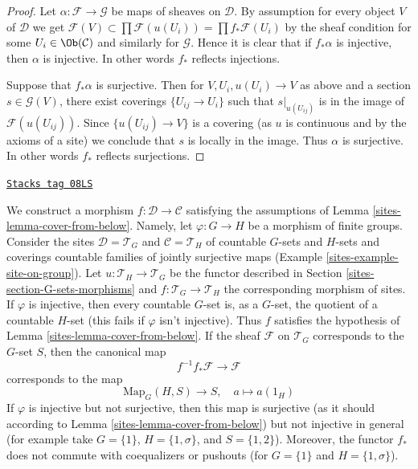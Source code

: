 \begin{proof}
Let $\alpha : \mathcal{F} \to \mathcal{G}$ be maps of sheaves
on $\mathcal{D}$. By assumption for every object $V$ of $\mathcal{D}$
we get $\mathcal{F}(V) \subset \prod \mathcal{F}(u(U_i)) =
\prod f_*\mathcal{F}(U_i)$ by the sheaf condition
for some $U_i \in \Ob(\mathcal{C})$ and similarly for $\mathcal{G}$.
Hence it is clear that if $f_*\alpha$ is injective, then
$\alpha$ is injective. In other words $f_*$ reflects injections.

\medskip\noindent
Suppose that $f_*\alpha$ is surjective. Then for $V, U_i, u(U_i) \to V$
as above and a section $s \in \mathcal{G}(V)$, there exist coverings
$\{U_{ij} \to U_i\}$ such that $s|_{u(U_{ij})}$ is in the image
of $\mathcal{F}(u(U_{ij}))$. Since $\{u(U_{ij}) \to V\}$ is a covering
(as $u$ is continuous and by the axioms of a site) we conclude that
$s$ is locally in the image. Thus $\alpha$ is surjective. In other
words $f_*$ reflects surjections.
\end{proof}

\begin{example}
\label{sites-example-cover-from-below}
\href{https://stacks.math.columbia.edu/tag/08LS}{\texttt{Stacks tag 08LS}}

We construct a morphism $f : \mathcal{D} \to \mathcal{C}$ satisfying
the assumptions of Lemma \ref{sites-lemma-cover-from-below}. Namely, let
$\varphi : G \to H$ be a morphism of finite groups. Consider the sites
$\mathcal{D} = \mathcal{T}_G$ and $\mathcal{C} = \mathcal{T}_H$ of countable
$G$-sets and $H$-sets and coverings countable families of jointly
surjective maps (Example \ref{sites-example-site-on-group}).
Let $u : \mathcal{T}_H \to \mathcal{T}_G$ be the functor described
in Section \ref{sites-section-G-sets-morphisms}
and $f : \mathcal{T}_G \to \mathcal{T}_H$ the
corresponding morphism of sites. If $\varphi$ is injective, then
every countable $G$-set is, as a $G$-set, the quotient of a countable
$H$-set (this fails if $\varphi$ isn't injective). Thus $f$ satisfies
the hypothesis of Lemma \ref{sites-lemma-cover-from-below}.
If the sheaf $\mathcal{F}$ on $\mathcal{T}_G$ corresponds to the $G$-set
$S$, then the canonical map
$$
f^{-1}f_*\mathcal{F} \longrightarrow \mathcal{F}
$$
corresponds to the map
$$
\text{Map}_G(H, S) \longrightarrow S,\quad
a \longmapsto a(1_H)
$$
If $\varphi$ is injective but not surjective, then this map is surjective
(as it should according to Lemma \ref{sites-lemma-cover-from-below})
but not injective in general
(for example take $G = \{1\}$, $H = \{1, \sigma\}$, and $S = \{1, 2\}$).
Moreover, the functor $f_*$ does not commute with coequalizers or
pushouts (for $G = \{1\}$ and $H = \{1, \sigma\}$).
\end{example}

